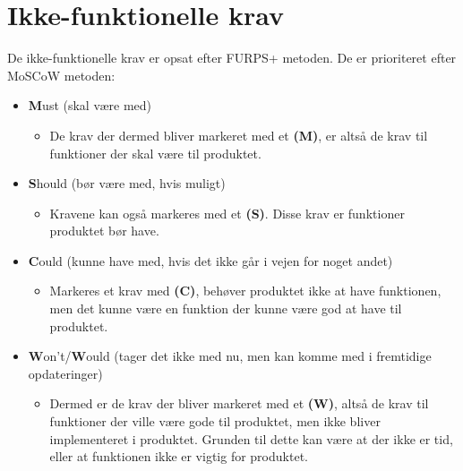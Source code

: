 \section{Ikke-funktionelle krav}
De ikke-funktionelle krav er opsat efter FURPS+ metoden. De er prioriteret efter MoSCoW metoden:
\begin{itemize}
\item \textbf{M}ust (skal være med)
\begin{itemize}
\item De krav der dermed bliver markeret med et \textbf{(M)}, er altså de krav til funktioner der skal være til produktet.
\end{itemize}
\item \textbf{S}hould (bør være med, hvis muligt)
\begin{itemize}
\item Kravene kan også markeres med et \textbf{(S)}. Disse krav er funktioner produktet bør have.
\end{itemize}
\item \textbf{C}ould (kunne have med, hvis det ikke går i vejen for noget andet)
\begin{itemize}
\item Markeres et krav med \textbf{(C)}, behøver produktet ikke at have funktionen, men det kunne være en funktion der kunne være god at have til produktet.
\end{itemize}
\item \textbf{W}on't/\textbf{W}ould (tager det ikke med nu, men kan komme med i fremtidige opdateringer)
\begin{itemize}
\item Dermed er de krav der bliver markeret med et \textbf{(W)}, altså de krav til funktioner der ville være gode til produktet, men ikke bliver implementeret i produktet. Grunden til dette kan være at der ikke er tid, eller at funktionen ikke er vigtig for produktet.
\end{itemize}
\end{itemize}
